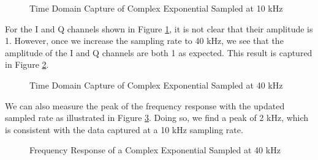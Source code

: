 \documentclass{article}
\begin{document}
\begin{figure}[H]
	\centerline{}
	\caption{Time Domain Capture of Complex Exponential Sampled at 10 kHz}
	\label{fig::complex_sampling_time_domain_10k_samp_rate}
\end{figure}

For the I and Q channels shown in Figure \ref{fig::complex_sampling_time_domain_10k_samp_rate}, it is not clear that their amplitude is 1. However, once we increase the sampling rate to 40 kHz, we see that the amplitude of the I and Q channels are both 1 as expected. This result is captured in Figure \ref{fig::complex_sampling_time_domain_40k_samp_rate}.

\begin{figure}[H]
	\centerline{}
	\caption{Time Domain Capture of Complex Exponential Sampled at 40 kHz}
	\label{fig::complex_sampling_time_domain_40k_samp_rate}
\end{figure}

We can also measure the peak of the frequency response with the updated sampled rate as illustrated in Figure \ref{fig::complex_sampling_freq_domain_40k_samp_rate}. Doing so, we find a peak of 2 kHz, which is consistent with the data captured at a 10 kHz sampling rate.

\begin{figure}[H]
	\centerline{}
	\caption{Frequency Response of a Complex Exponential Sampled at 40 kHz}
	\label{fig::complex_sampling_freq_domain_40k_samp_rate}
\end{figure}
\end{document}
